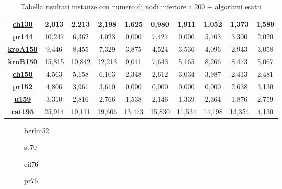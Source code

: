 \documentclass[11pt]{article}
\begin{document}
\begin{table}
\begin{adjustbox}{center}
\begin{tabular}{|c|c|c|c|c|c|c|c|c|c|}
        \hline 
        \textbf{\hyperref[fig:ch130]{ch130}} & 2,013 & 2,213 & 2,198 & 1,625 & 0,980 & 1,911 & 1,052 & 1,373 & 1,589\tabularnewline
        \hline 
        \textbf{\hyperref[fig:pr144]{pr144}} & 10,247 & 6,362 & 4,023 & 0,000 & 7,427 & 0,000 & 5,703 & 3,300 & 2,020\tabularnewline
        \hline 
        \textbf{\hyperref[fig:kroA150]{kroA150}} & 9,446 & 8,455 & 7,329 & 3,875 & 4,524 & 3,536 & 4,096 & 2,943 & 3,058\tabularnewline
        \hline 
        \textbf{\hyperref[fig:kroB150]{kroB150}} & 15,815 & 10,842 & 12,213 & 9,041 & 7,643 & 5,165 & 8,266 & 8,473 & 5,067\tabularnewline
        \hline 
        \textbf{\hyperref[fig:ch150]{ch150}} & 4,563 & 5,158 & 6,103 & 2,348 & 2,612 & 3,034 & 3,987 & 2,413 & 2,481\tabularnewline
        \hline 
        \textbf{\hyperref[fig:pr152]{pr152}} & 4,806 & 3,961 & 3,610 & 0,000 & 0,000 & 0,000 & 0,000 & 2,638 & 3,130\tabularnewline
        \hline 
        \textbf{\hyperref[fig:u159]{u159}} & 3,310 & 2,816 & 2,766 & 1,538 & 2,146 & 1,339 & 2,364 & 1,876 & 2,759\tabularnewline
        \hline 
        \textbf{\hyperref[fig:rat195]{rat195}} & 25,914 & 19,111 & 19,606 & 13,473 & 15,830 & 11,534 & 14,198 & 13,354 & 4,130\tabularnewline
        \hline 
\end{tabular}
\end{adjustbox}
\caption{Tabella risultati instanze con numero di nodi inferiore a \textbf{$200$} $+$ algoritmi esatti}
\end{table}

\begin{figure}[htbp]
    \centering
    \label{fig:berlin52}
    \caption{berlin52}
\end{figure}

\begin{figure}[htbp]
    \centering
    \label{fig:st70}
    \caption{st70}
\end{figure}

\begin{figure}[htbp]
    \centering
    \label{fig:eil76}
    \caption{eil76}
\end{figure}

\begin{figure}[htbp]
    \centering
    \label{fig:pr76}
    \caption{pr76}
\end{figure}
\end{document}
